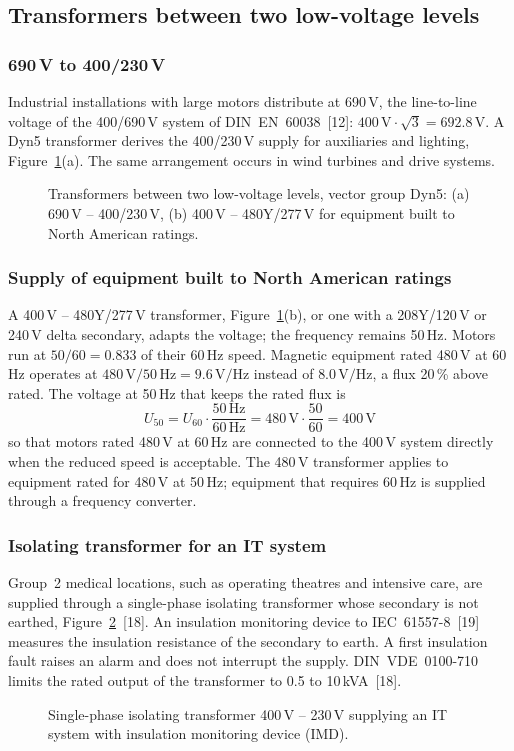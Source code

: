 \subsection{Transformers between two low-voltage levels}
\label{sec:de-lvlv}

\subsubsection{690\,V to 400/230\,V}
Industrial installations with large motors distribute at 690\,V, the
line-to-line voltage of the 400/690\,V system of DIN~EN~60038~[12]:
$400\,\mathrm{V} \cdot \sqrt{3} = 692.8\,\mathrm{V}$. A Dyn5 transformer
derives the 400/230\,V supply for auxiliaries and lighting,
Figure~\ref{fig:de-lvlv}(a). The same arrangement occurs in wind turbines
and drive systems.

\begin{figure}[!ht]
  \centering
  
  \caption{Transformers between two low-voltage levels, vector group Dyn5:
  (a) 690\,V -- 400/230\,V, (b) 400\,V -- 480Y/277\,V for equipment built
  to North American ratings.}
  \label{fig:de-lvlv}
\end{figure}

\subsubsection{Supply of equipment built to North American ratings}
A 400\,V -- 480Y/277\,V transformer, Figure~\ref{fig:de-lvlv}(b), or one
with a 208Y/120\,V or 240\,V delta secondary, adapts the voltage; the
frequency remains 50\,Hz. Motors run at $50/60 = 0.833$ of their 60\,Hz
speed. Magnetic equipment rated 480\,V at 60\,Hz operates at
$480\,\mathrm{V} / 50\,\mathrm{Hz} = 9.6\,\mathrm{V/Hz}$ instead of
$8.0\,\mathrm{V/Hz}$, a flux 20\,\% above rated. The voltage at 50\,Hz that
keeps the rated flux is
\begin{equation}
  U_{50} = U_{60} \cdot \frac{50\,\mathrm{Hz}}{60\,\mathrm{Hz}}
         = 480\,\mathrm{V} \cdot \frac{50}{60} = 400\,\mathrm{V}
  \label{eq:de-vhz}
\end{equation}
so that motors rated 480\,V at 60\,Hz are connected to the 400\,V system
directly when the reduced speed is acceptable. The 480\,V transformer
applies to equipment rated for 480\,V at 50\,Hz; equipment that requires
60\,Hz is supplied through a frequency converter.

\subsubsection{Isolating transformer for an IT system}
Group~2 medical locations, such as operating theatres and intensive care,
are supplied through a single-phase isolating transformer whose secondary
is not earthed, Figure~\ref{fig:de-it}~[18]. An insulation
monitoring device to IEC~61557-8~[19] measures the insulation
resistance of the secondary to earth. A first insulation fault raises an
alarm and does not interrupt the supply. DIN~VDE~0100-710 limits the rated
output of the transformer to 0.5 to 10\,kVA~[18].

\begin{figure}[!ht]
  \centering
  
  \caption{Single-phase isolating transformer 400\,V -- 230\,V supplying an
  IT system with insulation monitoring device (IMD).}
  \label{fig:de-it}
\end{figure}
\FloatBarrier
